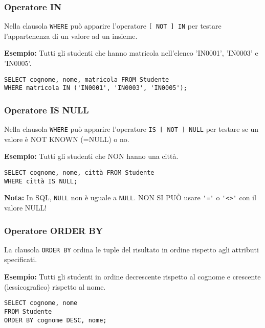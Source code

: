 \documentclass[a4paper, 10pt, titlepage]{article}
\begin{document}
	\subsubsection{Operatore IN}
		Nella clausola \lstinline|WHERE| può apparire l’operatore \lstinline|[ NOT ] IN| per testare
		l’appartenenza di un valore ad un insieme.
	
		\noindent
		\textbf{Esempio: }Tutti gli studenti che hanno matricola nell’elenco 'IN0001', 'IN0003' e
		'IN0005'.
		\begin{lstlisting}
SELECT cognome, nome, matricola FROM Studente
WHERE matricola IN ('IN0001', 'IN0003', 'IN0005');
		\end{lstlisting}
	
	\subsubsection{Operatore IS NULL}
		Nella clausola \lstinline|WHERE| può apparire l’operatore \lstinline|IS [ NOT ] NULL| per testare
		se un valore è NOT KNOWN (=NULL) o no.
	
		\noindent
		\textbf{Esempio: }Tutti gli studenti che NON hanno una città.
\begin{lstlisting}
SELECT cognome, nome, città FROM Studente
WHERE città IS NULL;
\end{lstlisting}
	\textbf{Nota: }In SQL, \lstinline|NULL| non è uguale a \lstinline|NULL|.
	NON SI PUÒ usare \lstinline|'='| o \lstinline|'<>'| con il valore NULL!
	
	\subsubsection{Operatore ORDER BY}
		La clausola \lstinline|ORDER BY| ordina le tuple del risultato in ordine rispetto agli
		attributi specificati.
		
		\noindent
		\textbf{Esempio: }Tutti gli studenti in ordine decrescente rispetto al cognome e crescente
		(lessicografico) rispetto al nome.
		\begin{lstlisting}
SELECT cognome, nome
FROM Studente
ORDER BY cognome DESC, nome;
		\end{lstlisting}
		
\end{document}
